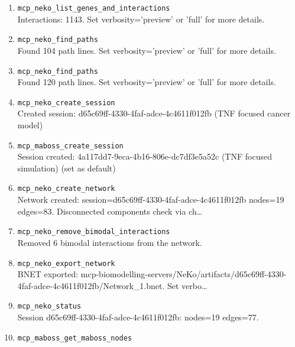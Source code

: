 \begin{enumerate}
\RaggedRight MaBoSS Mutant Simulation: State Probability Trajectory
\item[19.] \texttt{mcp\_\allowbreak{}neko\_\allowbreak{}list\_\allowbreak{}genes\_\allowbreak{}and\_\allowbreak{}interactions}
\hfill\\
\RaggedRight Interactions: 1143. Set verbosity='preview' or 'full' for more details.
\item[20.] \texttt{mcp\_\allowbreak{}neko\_\allowbreak{}find\_\allowbreak{}paths}
\hfill\\
\RaggedRight Found 104 path lines. Set verbosity='preview' or 'full' for more details.
\item[21.] \texttt{mcp\_\allowbreak{}neko\_\allowbreak{}find\_\allowbreak{}paths}
\hfill\\
\RaggedRight Found 120 path lines. Set verbosity='preview' or 'full' for more details.
\item[22.] \texttt{mcp\_\allowbreak{}neko\_\allowbreak{}create\_\allowbreak{}session}
\hfill\\
\RaggedRight Created session: d65c69ff-4330-4faf-adce-4c4611f012fb (TNF focused cancer model)
\item[23.] \texttt{mcp\_\allowbreak{}maboss\_\allowbreak{}create\_\allowbreak{}session}
\hfill\\
\RaggedRight Session created: 4a117dd7-9eca-4b16-806e-dc7df3e5a52c (TNF focused simulation) (set as default)
\item[24.] \texttt{mcp\_\allowbreak{}neko\_\allowbreak{}create\_\allowbreak{}network}
\hfill\\
\RaggedRight Network created: session=d65c69ff-4330-4faf-adce-4c4611f012fb nodes=19 edges=83. Disconnected components check via ch\ldots{}
\item[25.] \texttt{mcp\_\allowbreak{}neko\_\allowbreak{}remove\_\allowbreak{}bimodal\_\allowbreak{}interactions}
\hfill\\
\RaggedRight Removed 6 bimodal interactions from the network.
\item[26.] \texttt{mcp\_\allowbreak{}neko\_\allowbreak{}export\_\allowbreak{}network}
\hfill\\
\RaggedRight BNET exported: mcp-biomodelling-servers/NeKo/artifacts/d65c69ff-4330-4faf-adce-4c4611f012fb/Network\_1.bnet. Set verbo\ldots{}
\item[27.] \texttt{mcp\_\allowbreak{}neko\_\allowbreak{}status}
\hfill\\
\RaggedRight Session d65c69ff-4330-4faf-adce-4c4611f012fb: nodes=19 edges=77.
\item[28.] \texttt{mcp\_\allowbreak{}maboss\_\allowbreak{}get\_\allowbreak{}maboss\_\allowbreak{}nodes}

\end{enumerate}
